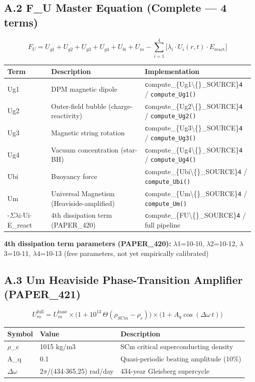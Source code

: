 \documentclass[11pt]{article}
\begin{document}
\subsection*{A.2 F\_U Master Equation (Complete --- 4 terms)}

$$F_U = U_{g1} + U_{g2} + U_{g3} + U_{g4} + U_{bi} + U_m - \sum_{i=1}^{4}\bigl[\lambda_i \cdot U_i(r,t) \cdot E_{\mathrm{react}}\bigr]$$

\begin{center}
\begin{longtable}{lll}
\toprule
Term & Description & Implementation \tabularnewline
\midrule
\endhead
Ug1 & DPM magnetic dipole & \verb|c|ompute\_\{Ug1\textbackslash\{\}\_SOURCE\}\verb|4| / \verb|compute_Ug1()| \tabularnewline
Ug2 & Outer-field bubble (charge-reactivity) & \verb|c|ompute\_\{Ug2\textbackslash\{\}\_SOURCE\}\verb|4| / \verb|compute_Ug2()| \tabularnewline
Ug3 & Magnetic string rotation & \verb|c|ompute\_\{Ug3\textbackslash\{\}\_SOURCE\}\verb|4| / \verb|compute_Ug3()| \tabularnewline
Ug4 & Vacuum concentration (star-BH) & \verb|c|ompute\_\{Ug4\textbackslash\{\}\_SOURCE\}\verb|4| / \verb|compute_Ug4()| \tabularnewline
Ubi & Buoyancy force & \verb|c|ompute\_\{Ubi\textbackslash\{\}\_SOURCE\}\verb|4| / \verb|compute_Ubi()| \tabularnewline
Um & Universal Magnetism (Heaviside-amplified) & \verb|c|ompute\_\{Um\textbackslash\{\}\_SOURCE\}\verb|4| / \verb|compute_Um()| \tabularnewline
-$\Sigma$$\lambda$i$\cdot$Ui$\cdot$E\_react & 4th dissipation term (PAPER\_420) & \verb|c|ompute\_\{FU\textbackslash\{\}\_SOURCE\}\verb|4| / full pipeline \tabularnewline
\bottomrule
\end{longtable}
\end{center}

\textbf{4th dissipation term parameters (PAPER\_420):} $\lambda$1=10-10, $\lambda$2=10-12, $\lambda$3=10-11, $\lambda$4=10-13 (free parameters, not yet empirically calibrated)

\subsection*{A.3 Um Heaviside Phase-Transition Amplifier (PAPER\_421)}

$$U_m^{\mathrm{full}} = U_m^{\mathrm{base}} \times \bigl(1 + 10^{13}\,\Theta(\rho_{SCm} - \rho_c)\bigr) \times \bigl(1 + A_q\cos(\Delta\omega\,t)\bigr)$$

\begin{center}
\begin{longtable}{lll}
\toprule
Symbol & Value & Description \tabularnewline
\midrule
\endhead
$\rho$\_c & 1015 kg/m3 & SCm critical superconducting density \tabularnewline
A\_q & 0.1 & Quasi-periodic beating amplitude (10\%) \tabularnewline
$\Delta$$\omega$ & 2$\pi$/(434$\cdot$365.25) rad/day & 434-year Gleisberg supercycle \tabularnewline
\bottomrule
\end{longtable}
\end{center}
\end{document}
